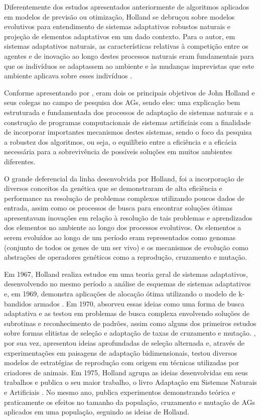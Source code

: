 Diferentemente dos estudos apresentados anteriormente de algoritmos aplicados em modelos de previsão ou otimização, Holland se debruçou sobre modelos evolutivos para entendimento de sistemas adaptativos robustos naturais e projeção de elementos adaptativos em um dado contexto. Para o autor, em sistemas adaptativos naturais, as características relativas à competição entre os agentes e de inovação ao longo destes processos naturais eram fundamentais para que os indivíduos se adaptassem ao ambiente e às mudanças imprevistas que este ambiente aplicava sobre esses indivíduos \cite{back_handbook_1997}.

Conforme apresentando por \cite[p. 1]{goldberg_genetic_1989}, eram dois os principais objetivos de John Holland e seus colegas no campo de pesquisa dos AGs, sendo eles: uma explicação bem estruturada e fundamentada dos processos de adaptação de sistemas naturais e a construção de programas computacionais de sistemas artificiais com a finalidade de incorporar importantes mecanismos destes sistemas, sendo o foco da pesquisa a robustez dos algoritmos, ou seja, o equilíbrio entre a eficiência e a eficácia necessária para a sobrevivência de possíveis soluções em muitos ambientes diferentes.

O grande deferencial da linha desenvolvida por Holland, foi a incorporação de diversos conceitos da genética que se demonstraram de alta eficiência e performance na resolução de problemas complexos utilizando poucos dados de entrada, assim como os processos de busca para encontrar soluções ótimas apresentavam inovações em relação à resolução de tais problemas e aprendizados dos elementos no ambiente ao longo dos processos evolutivos. Os elementos a serem evoluídos ao longo de um período eram representados como genomas (conjunto de todos os genes de um ser vivo) e os mecanismos de evolução como abstrações de operadores genéticos como a reprodução, cruzamento e mutação.

Em 1967, Holland realiza estudos em uma teoria geral de sistemas adaptativos, desenvolvendo no mesmo período a análise de esquemas de sistemas adaptativos e, em 1969, demonstra aplicações de alocação ótima utilizando o modelo de k-bandidos armados . Em 1970, \cite{cavicchio_adaptive_1970} absorveu essas ideias como uma forma de busca adaptativa e as testou em problemas de busca complexa envolvendo soluções de subrotinas e reconhecimento de padrões, assim como alguns dos primeiros estudos sobre formas elitistas de seleção e adaptação de taxas de cruzamento e mutação. \cite{university_of_michigan_artificial_1971}, por sua vez, apresentou ideias aprofundadas de seleção alternada e, através de experimentações em paisagens de adaptação bidimensionais, testou diversos modelos de estratégias de reprodução com origem em técnicas utilizadas por criadores de animais. Em 1975, Holland agrupa as ideias desenvolvidas em seus trabalhos e publica o seu maior trabalho, o livro Adaptação em Sistemas Naturais e Artificiais \cite{holland_adaptation_1975}. No mesmo ano, \cite{jong_analysis_1975} publica experimentos demonstrando teórica e praticamente os efeitos no tamanho da população, cruzamento e mutação de AGs aplicados em uma população, seguindo as ideias de Holland.

